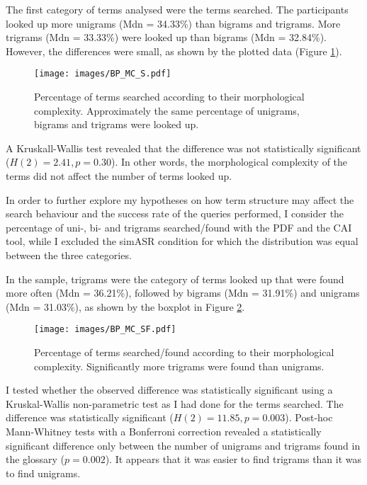 The first category of terms analysed were the terms searched. The participants looked up more unigrams (Mdn = 34.33\%) than bigrams and trigrams. More trigrams (Mdn = 33.33\%) were looked up than bigrams (Mdn = 32.84\%). However, the differences were small, as shown by the plotted data (Figure \ref{fig:BP_MC_S}).

\begin{figure}
\texttt{[image: images/BP\_MC\_S.pdf]}
\caption[Percentage of terms searched by morphological complexity]{Percentage of terms searched according to their morphological complexity. Approximately the same percentage of unigrams, bigrams and trigrams were looked up.}
\label{fig:BP_MC_S}
\end{figure}

A Kruskall-Wallis test revealed that the difference was not statistically significant ($H(2) = 2.41, p = 0.30$). In other words, the morphological complexity of the terms did not affect the number of terms looked up.

 \label{terms_found_structure}
In order to further explore my hypotheses on how term structure may affect the search behaviour and the success rate of the queries performed, I consider the percentage of uni-, bi- and trigrams searched/found with the PDF and the CAI tool, while I excluded the simASR condition for which the distribution was equal between the three categories.

In the sample, trigrams were the category of terms looked up that were found more often (Mdn = 36.21\%), followed by bigrams (Mdn = 31.91\%) and unigrams (Mdn = 31.03\%), as shown by the boxplot in Figure \ref{fig:BP_MC_SF}.

\begin{figure}
\texttt{[image: images/BP\_MC\_SF.pdf]}
\caption[Percentage of terms searched/found by morphological complexity]{Percentage of terms searched/found according to their morphological complexity. Significantly more trigrams were found than unigrams.}
\label{fig:BP_MC_SF}
\end{figure}


I tested whether the observed difference was statistically significant using a Kruskal-Wallis non-parametric test as I had done for the terms searched. The difference was statistically significant ($H(2) = 11.85, p = 0.003$). Post-hoc Mann-Whitney tests with a Bonferroni correction revealed a statistically significant difference only between the number of unigrams and trigrams found in the glossary ($p = 0.002$). It appears that it was easier to find trigrams than it was to find unigrams.

